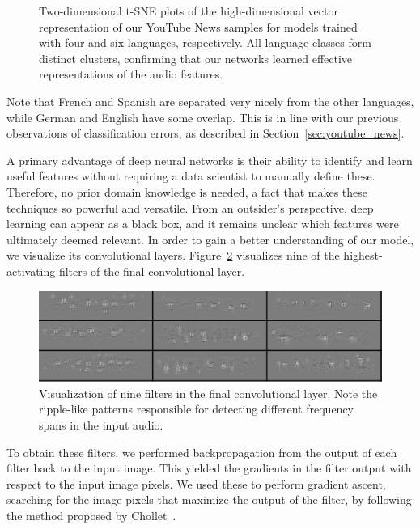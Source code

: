 \begin{figure}[tp]
\begin{minipage}{.5\textwidth}
	\end{minipage}
	\caption{Two-dimensional t-SNE plots of the high-dimensional vector representation of our YouTube News samples for models trained with four and six languages,  respectively. All language classes form distinct clusters, confirming that our networks learned effective representations of the audio features.}
	\label{fig:tsne}
	\end{figure}
%
Note that French and Spanish are separated very nicely from the other languages, while German and English have some overlap. This is in line with our previous observations of classification errors, as described in Section~\ref{sec:youtube_news}.

A primary advantage of deep neural networks is their ability to identify and learn useful features without requiring a data scientist to manually define these. Therefore, no prior domain knowledge is needed, a fact that makes these techniques so powerful and versatile. From an outsider's perspective, deep learning can appear as a black box, and it remains unclear which features were ultimately deemed relevant. In order to gain a better understanding of our model, we visualize its convolutional layers. Figure~\ref{fig:conv_filter} visualizes nine of the highest-activating filters of the final convolutional layer.
%
	\begin{figure}[tp]
  		\centering
    	\includegraphics[width=\textwidth, keepaspectratio]{img/conv_filter.png}
    	\caption{Visualization of nine filters in the final convolutional layer. Note the ripple-like patterns responsible for detecting different frequency spans in the input audio.}
    	\label{fig:conv_filter}
	\end{figure}
%
To obtain these filters, we performed backpropagation from the output of each filter back to the input image. This yielded the gradients in the filter output with respect to the input image pixels. We used these to perform gradient ascent, searching for the image pixels that maximize the output of the filter, by following the method proposed by Chollet~\cite{chol16}.

